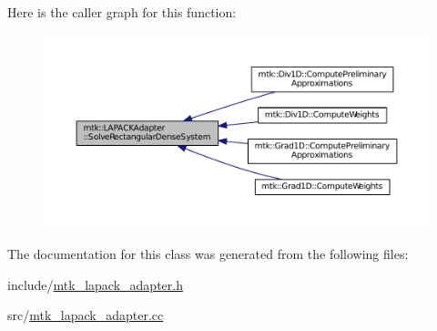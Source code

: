 Here is the caller graph for this function\-:
\nopagebreak
\begin{figure}[H]
\begin{center}
\leavevmode
\includegraphics[width=350pt]{classmtk_1_1LAPACKAdapter_a380f148ffdf96bae2f79ae28f1a6560c_icgraph}
\end{center}
\end{figure}




The documentation for this class was generated from the following files\-:\begin{DoxyCompactItemize}
\item 
include/\hyperlink{mtk__lapack__adapter_8h}{mtk\-\_\-lapack\-\_\-adapter.\-h}\item 
src/\hyperlink{mtk__lapack__adapter_8cc}{mtk\-\_\-lapack\-\_\-adapter.\-cc}\end{DoxyCompactItemize}
